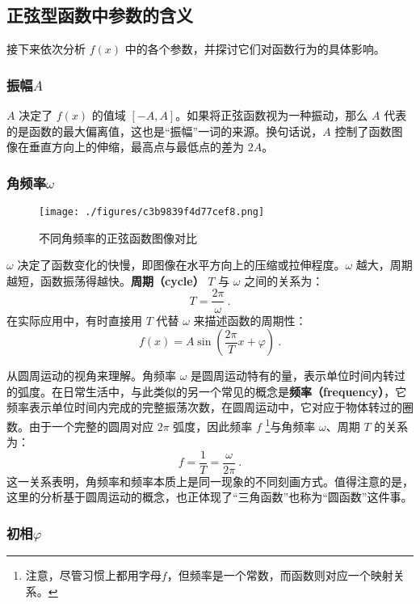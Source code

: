 \subsection{正弦型函数中参数的含义}

接下来依次分析 $f(x)$ 中的各个参数，并探讨它们对函数行为的具体影响。

\subsubsection{振幅$A$}

$A$ 决定了 $f(x)$ 的值域 $\left[-A, A\right]$。如果将正弦函数视为一种振动，那么 $A$ 代表的是函数的最大偏离值，这也是“振幅”一词的来源。换句话说，$A$ 控制了函数图像在垂直方向上的伸缩，最高点与最低点的差为 $2A$。
\subsubsection{角频率$\omega$}
\begin{figure}[ht]
\centering
\texttt{[image: ./figures/c3b9839f4d77cef8.png]}
\caption{不同角频率的正弦函数图像对比} \label{fig_HsSinF_1}
\end{figure}
$\omega$ 决定了函数变化的快慢，即图像在水平方向上的压缩或拉伸程度。$\omega$ 越大，周期越短，函数振荡得越快。\textbf{周期（cycle）} $T$ 与 $\omega$ 之间的关系为：
\begin{equation}
    T = \frac{2\pi}{\omega}~.
\end{equation}
在实际应用中，有时直接用 $T$ 代替 $\omega$ 来描述函数的周期性：
\begin{equation}
    f(x) = A\sin\left(\frac{2\pi}{T} x + \varphi\right)~.
\end{equation}

从圆周运动的视角来理解。角频率 $\omega$ 是圆周运动特有的量，表示单位时间内转过的弧度。在日常生活中，与此类似的另一个常见的概念是\textbf{频率（frequency）}，它频率表示单位时间内完成的完整振荡次数，在圆周运动中，它对应于物体转过的圈数。由于一个完整的圆周对应 $2\pi$ 弧度，因此频率 $f$ \footnote{注意，尽管习惯上都用字母$f$，但频率是一个常数，而函数则对应一个映射关系。}与角频率 $\omega$、周期 $T$ 的关系为：
\begin{equation}
    f = \frac{1}{T} = \frac{\omega}{2\pi}~.
\end{equation}
这一关系表明，角频率和频率本质上是同一现象的不同刻画方式。值得注意的是，这里的分析基于圆周运动的概念，也正体现了“三角函数”也称为“圆函数”这件事。

\subsubsection{初相$\varphi$}

